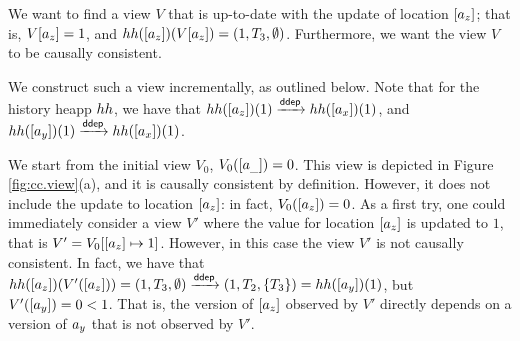 \begin{example}
%
%
% 
We want to find a view $V$ that is up-to-date with the update of location $[a_z]$; 
that is, $V[a_z] = 1$, and $hh([a_z])(V[a_z]) = (1, T_3, \emptyset)$.
Furthermore, we want the view $V$ to be causally consistent. 

We construct such a view incrementally, as outlined below. 
Note that for the history heapp $hh$, we have that 
$hh([a_z])(1) \xrightarrow{\mathsf{ddep}} hh([a_x])(1)$, 
and $hh([a_y])(1) \xrightarrow{\mathsf{ddep}} hh([a_x])(1)$.


We start from the initial view $V_0$, $V_0([a_{\_}]) = 0$. This view is 
depicted in Figure \ref{fig:cc.view}(a), and it is 
causally consistent by definition. However, it does not include the update to location $[a_z]$: in
 fact, $V_0([a_z]) = 0$. As a first try, one could immediately consider a view $V'$ 
where the value for location $[a_z]$ is updated to $1$, 
that is $V' = V_0[ [a_z] \mapsto 1]$. However, in this case 
the view $V'$ is not causally consistent. In fact, 
we have that $hh([a_z])(V'([a_z])) = (1, T_3, \emptyset) \xrightarrow{\mathsf{ddep}} 
(1, T_2, \{T_3\}) = hh([a_y])(1)$, but $V'([a_y]) = 0 < 1$. 
That is, the version of $[a_z]$ observed by $V'$ directly depends on a version 
of $a_y$ that is not observed by $V'$.
%


\end{example}
